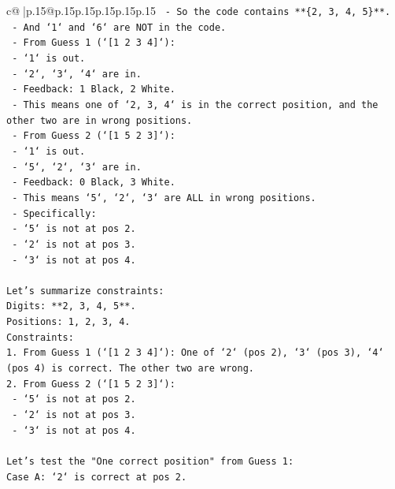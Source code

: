 \documentclass{article}
\begin{document}
{\begin{supertabular}{c@{$\;$}|p{.15\linewidth}@{}p{.15\linewidth}p{.15\linewidth}p{.15\linewidth}p{.15\linewidth}p{.15\linewidth}}
{{{\texttt{            {-} So the code contains **\{2, 3, 4, 5\}**.} \\
\texttt{            {-} And `1` and `6` are NOT in the code.} \\
\texttt{            {-} From Guess 1 (`{[}1 2 3 4{]}`):} \\
\texttt{              {-} `1` is out.} \\
\texttt{              {-} `2`, `3`, `4` are in.} \\
\texttt{              {-} Feedback: 1 Black, 2 White.} \\
\texttt{              {-} This means one of `2, 3, 4` is in the correct position, and the other two are in wrong positions.} \\
\texttt{            {-} From Guess 2 (`{[}1 5 2 3{]}`):} \\
\texttt{              {-} `1` is out.} \\
\texttt{              {-} `5`, `2`, `3` are in.} \\
\texttt{              {-} Feedback: 0 Black, 3 White.} \\
\texttt{              {-} This means `5`, `2`, `3` are ALL in wrong positions.} \\
\texttt{              {-} Specifically:} \\
\texttt{                {-} `5` is not at pos 2.} \\
\texttt{                {-} `2` is not at pos 3.} \\
\texttt{                {-} `3` is not at pos 4.} \\
\\ 
\texttt{Let's summarize constraints:} \\
\texttt{Digits: **2, 3, 4, 5**.} \\
\texttt{Positions: 1, 2, 3, 4.} \\
\texttt{Constraints:} \\
\texttt{1. From Guess 1 (`{[}1 2 3 4{]}`): One of `2` (pos 2), `3` (pos 3), `4` (pos 4) is correct. The other two are wrong.} \\
\texttt{2. From Guess 2 (`{[}1 5 2 3{]}`):} \\
\texttt{   {-} `5` is not at pos 2.} \\
\texttt{   {-} `2` is not at pos 3.} \\
\texttt{   {-} `3` is not at pos 4.} \\
\\ 
\texttt{Let's test the "One correct position" from Guess 1:} \\
\texttt{Case A: `2` is correct at pos 2.} \\
}}}
\end{supertabular}}
\end{document}
